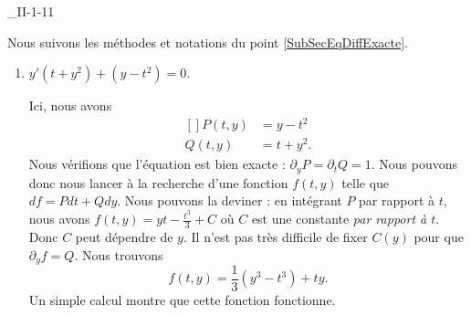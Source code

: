 

\begin{corrige}{_II-1-11}

Nous suivons les méthodes et notations du point \ref{SubSecEqDiffExacte}. 

\begin{enumerate}
\item 
$y'(t+y^2)+(y-t^2)=0$.

Ici, nous avons
\begin{equation}
	\begin{aligned}[]
		P(t,y)	&=y-t^2\\
		Q(t,y)	&=t+y^2.
	\end{aligned}
\end{equation}
Nous vérifions que l'équation est bien exacte : $\partial_yP=\partial_tQ=1$. Nous pouvons donc nous lancer à la recherche d'une fonction $f(t,y)$ telle que $df=Pdt+Qdy$. Nous pouvons la deviner : en intégrant $P$ par rapport à $t$, nous avons $f(t,y)=yt-\frac{ t^3 }{ 3 }+C$ où $C$ est une constante \emph{par rapport à $t$}. Donc $C$ peut dépendre de $y$. Il n'est pas très difficile de fixer $C(y)$ pour que $\partial_yf=Q$. Nous trouvons
\begin{equation}		\label{EqII111FonctionIntf}
	f(t,y)=\frac{1}{ 3 }(y^3-t^3)+ty.
\end{equation}
Un simple calcul montre que cette fonction fonctionne.


\end{enumerate}
\end{corrige}
